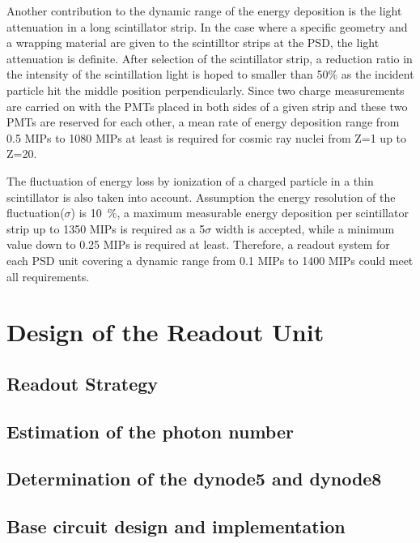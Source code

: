 \documentclass[5p, times]{elsarticle}
\begin{document}
Another contribution to the dynamic range of the energy deposition is the light attenuation in a long scintillator strip. 
In the case where a specific geometry and a wrapping material are given to the scintilltor strips at the PSD, the light attenuation is definite. 
After selection of the scintillator strip, a reduction ratio in the intensity of the scintillation light is hoped to smaller than 50\% as the incident particle hit the middle position perpendicularly.
Since two charge measurements are carried on with the PMTs placed in both sides of a given strip and these two PMTs are reserved for each other, a mean rate of energy deposition range from 0.5 MIPs to 1080 MIPs at least is required for cosmic ray nuclei from Z=1 up to Z=20.

The fluctuation of energy loss by ionization of a charged particle in a thin scintillator is also taken into account.
Assumption the energy resolution of the fluctuation($\sigma$) is \SI{10}{\percent}, a maximum measurable energy deposition per scintillator strip up to 1350 MIPs is required as a 5$\sigma $ width is accepted, while a minimum value down to 0.25 MIPs is required at least. 
Therefore, a readout system for each PSD unit covering a dynamic range from 0.1 MIPs to 1400 MIPs could meet all requirements.

\section{Design of the Readout Unit}
\label{sec:design}

\subsection{Readout Strategy}

\subsection{Estimation of the photon number}

\subsection{Determination of the dynode5 and dynode8}

\subsection{Base circuit design and implementation}
\end{document}

